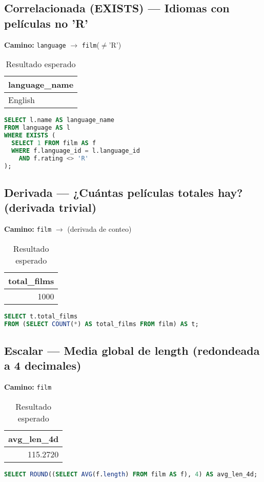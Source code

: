\documentclass[12pt,a4paper]{article}
\begin{document}
\subsection{Correlacionada (EXISTS) — Idiomas con películas no 'R'}
\textbf{Camino:} \texttt{language} $\rightarrow$ \texttt{film}($\neq$'R')

\begin{table}[h]
\centering
\caption{Resultado esperado}
\begin{tabular}{@{}l@{}}
\toprule
\textbf{language\_name} \\
\midrule
English \\
\bottomrule
\end{tabular}
\end{table}

\begin{lstlisting}[language=SQL]
SELECT l.name AS language_name
FROM language AS l
WHERE EXISTS (
  SELECT 1 FROM film AS f
  WHERE f.language_id = l.language_id
    AND f.rating <> 'R'
);
\end{lstlisting}

\subsection{Derivada — ¿Cuántas películas totales hay? (derivada trivial)}
\textbf{Camino:} \texttt{film} $\rightarrow$ (derivada de conteo)

\begin{table}[h]
\centering
\caption{Resultado esperado}
\begin{tabular}{@{}r@{}}
\toprule
\textbf{total\_films} \\
\midrule
1000 \\
\bottomrule
\end{tabular}
\end{table}

\begin{lstlisting}[language=SQL]
SELECT t.total_films
FROM (SELECT COUNT(*) AS total_films FROM film) AS t;
\end{lstlisting}

\subsection{Escalar — Media global de length (redondeada a 4 decimales)}
\textbf{Camino:} \texttt{film}

\begin{table}[h]
\centering
\caption{Resultado esperado}
\begin{tabular}{@{}r@{}}
\toprule
\textbf{avg\_len\_4d} \\
\midrule
115.2720 \\
\bottomrule
\end{tabular}
\end{table}

\begin{lstlisting}[language=SQL]
SELECT ROUND((SELECT AVG(f.length) FROM film AS f), 4) AS avg_len_4d;
\end{lstlisting}
\end{document}
